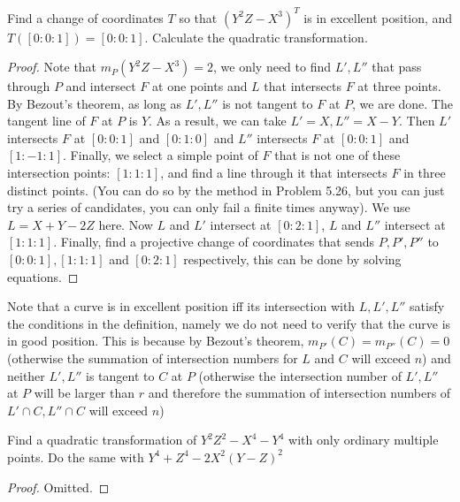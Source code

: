 \documentclass{solution}
\begin{document}
\begin{problem}{7.11}
    Find a change of coordinates $T$ so that $(Y^2Z - X^3)^T$ is in excellent position, and $T([0:0:1]) = [0:0:1]$. Calculate the quadratic transformation.
\end{problem}

\begin{proof}
    Note that $m_P(Y^2Z - X^3) = 2$, we only need to find $L', L''$ that pass through $P$ and intersect $F$ at one points and $L$ that intersects $F$ at three points. By Bezout's theorem, as long as $L', L''$ is not tangent to $F$ at $P$, we are done. The tangent line of $F$ at $P$ is $Y$. As a result, we can take $L' = X, L'' = X - Y$. Then $L'$ intersects $F$ at $[0:0:1]$ and $[0:1:0]$ and $L''$ intersects $F$ at $[0:0:1]$ and $[1:-1:1]$. Finally, we select a simple point of $F$ that is not one of these intersection points: $[1:1:1]$, and find a line through it that intersects $F$ in three distinct points. (You can do so by the method in Problem 5.26, but you can just try a series of candidates, you can only fail a finite times anyway). We use $L = X + Y - 2Z$ here. Now $L$ and $L'$ intersect at $[0: 2: 1]$, $L$ and $L''$ intersect at $[1:1:1]$. Finally, find a projective change of coordinates that sends $P, P', P''$ to $[0:0:1], [1:1:1]$ and $[0:2:1]$ respectively, this can be done by solving equations.
\end{proof}

Note that a curve is in excellent position iff its intersection with $L, L', L''$ satisfy the conditions in the definition, namely we do not need to verify that the curve is in good position. This is because by Bezout's theorem, $m_{P'}(C) = m_{P''}(C) = 0$ (otherwise the summation of intersection numbers for $L$ and $C$ will exceed $n$) and neither $L', L''$ is tangent to $C$ at $P$ (otherwise the intersection number of $L', L''$ at $P$ will be larger than $r$ and therefore the summation of intersection numbers of $L' \cap C, L'' \cap C$ will exceed $n$)

\begin{problem}{7.12}
    Find a quadratic transformation of $Y^2Z^2 - X^4 - Y^4$ with only ordinary multiple points. Do the same with $Y^4 + Z^4 - 2X^2(Y - Z)^2$
\end{problem}

\begin{proof}
    Omitted. \TODO
\end{proof}
\end{document}

